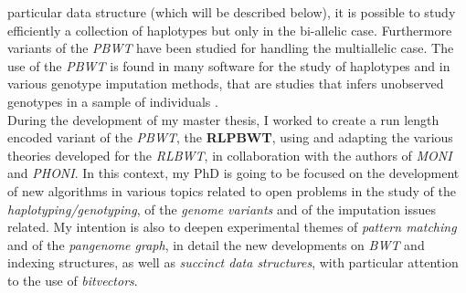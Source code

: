 \documentclass[a4paper,11pt, oneside]{article}
\begin{document}
particular data structure (which will be described below), it is possible to
study efficiently a collection of haplotypes but only in the bi-allelic
case. Furthermore variants of the \textit{PBWT} have been studied for
handling the multiallelic case. The use of the \textit{PBWT} is found in many
software for the study of haplotypes and in various genotype imputation methods,
that are studies that infers unobserved genotypes in a sample of individuals
\cite{impute5}.\\
During the development of my master thesis, I worked to create a run length
encoded variant of the \textit{PBWT}, the \textbf{RLPBWT}, using and adapting
the various theories developed for the \textit{RLBWT}, in collaboration with the
authors of \textit{MONI} and \textit{PHONI}. In this context, my PhD
is going to be focused on the development of new algorithms in
various topics related to open problems in the study of the
\textit{haplotyping/genotyping}, of the \textit{genome 
  variants} and of the imputation issues related. My intention is also to deepen
experimental themes  
of \textit{pattern matching} and of the \textit{pangenome graph}, in detail the
new developments on \textit{BWT} and indexing structures, as well as
\textit{succinct data structures}, with particular attention to the use of
\textit{bitvectors}.
\end{document}
